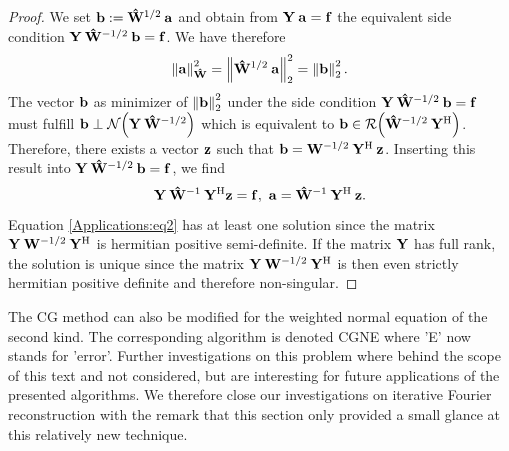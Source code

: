   \begin{proof}
    We set $\mathbf{b} := \mathbf{\hat{W}}^{1/2}\:\mathbf{a}$ and obtain from $\mathbf{Y}\:\mathbf{a} = \mathbf{f}$ the equivalent 
    side condition $\mathbf{Y}\:\mathbf{\hat{W}}^{-1/2}\:\mathbf{b} = \mathbf{f}$. We have therefore
    \[
      \left\|\mathbf{a}\right\|_{\mathbf{\hat{W}}}^2 = \left\|\mathbf{\hat{W}}^{1/2}\:\mathbf{a}\right\|_{2}^2 = \left\|\mathbf{b}\right\|_{2}^2.
    \]
    The vector $\mathbf{b}$ as minimizer of $\left\|\mathbf{b}\right\|_{2}^2$ under the side condition 
    $\mathbf{Y}\:\mathbf{\hat{W}}^{-1/2}\:\mathbf{b} = \mathbf{f}$ must fulfill $\mathbf{b} \perp \mathcal{N}{\hspace{-0.4ex}}\left(\mathbf{Y}\:\mathbf{\hat{W}}^{-1/2}\right)$ 
    which is equivalent to $\mathbf{b} \in \mathcal{R}{\hspace{-0.4ex}}\left(\mathbf{\hat{W}}^{-1/2}\:\mathbf{Y}^{\text{\rm{H}}}\right)$. Therefore, there exists a vector
    $\mathbf{z}$ such that $\mathbf{b} = \mathbf{W}^{-1/2}\:\mathbf{Y}^{\text{\rm{H}}}\: \mathbf{z}$. Inserting this result into 
    $\mathbf{Y}\:\mathbf{\hat{W}}^{-1/2}\:\mathbf{b} = \mathbf{f}$, we find
    \begin{equation}
      \label{Applications:eq2}
      \mathbf{Y} \: \mathbf{\hat{W}}^{-1} \: \mathbf{Y}^{\text{\rm{H}}} \mathbf{z} = \mathbf{f},\ \mathbf{a} = \mathbf{\hat{W}}^{-1}\:\mathbf{Y}^{\text{\rm{H}}}\:\mathbf{z}.
    \end{equation}
    Equation \eqref{Applications:eq2} has at least one solution since the matrix $\mathbf{Y}\:\mathbf{W}^{-1/2}\:\mathbf{Y}^{\text{\rm{H}}}$
    is hermitian positive semi-definite. If the matrix $\mathbf{Y}$ has full rank, the solution is unique 
    since the matrix $\mathbf{Y}\:\mathbf{W}^{-1/2}\:\mathbf{Y}^{\text{\rm{H}}}$ is then even strictly hermitian positive definite
    and therefore non-singular.
  \end{proof}
  
  The CG method can also be modified for the weighted normal equation of the second kind. The corresponding 
  algorithm is denoted CGNE where 'E' now stands for 'error'. Further investigations on this problem where 
  behind the scope of this text and not considered, but are interesting for future applications of the 
  presented algorithms. We therefore close our investigations on iterative Fourier reconstruction with the 
  remark that this section only provided a small glance at this relatively new technique.
